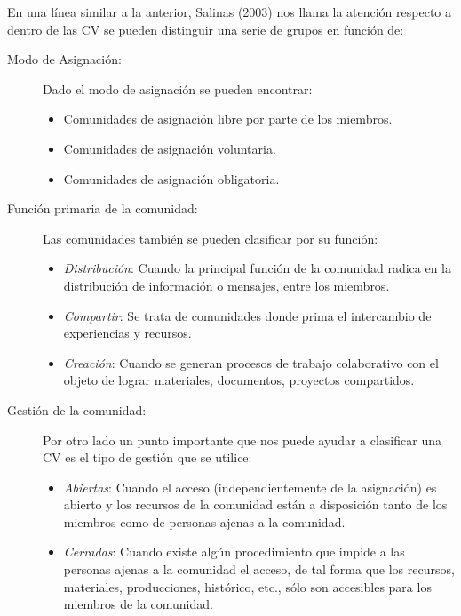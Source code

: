 En una línea similar a la anterior, Salinas (2003) nos llama la atención respecto a dentro de las CV se pueden distinguir una serie de grupos en función de:

\begin{description}
\item[Modo de Asignación: ] 
Dado el modo de asignación se pueden encontrar: 

\begin{itemize}
\item Comunidades de asignación libre por parte de los miembros.
\item Comunidades de asignación voluntaria.
\item Comunidades de asignación obligatoria.
\end{itemize}


\item[Función primaria de la comunidad: ] 
Las comunidades también se pueden clasificar por su función:  

\begin{itemize}
\item \emph{Distribución}: Cuando la principal función de la comunidad radica en la distribución de información o mensajes, entre los miembros.
\item \emph{Compartir}: Se trata de comunidades donde prima el intercambio de experiencias y recursos.
\item \emph{Creación}: Cuando se generan procesos de trabajo colaborativo con el objeto de lograr materiales, documentos, proyectos compartidos.
\end{itemize}


\item[Gestión de la comunidad: ] 
Por otro lado un punto importante que nos puede ayudar a clasificar una CV es el tipo de gestión que se utilice: 

\begin{itemize}
\item \emph{Abiertas}: Cuando el acceso (independientemente de la asignación) es abierto y los recursos de la comunidad están a disposición tanto de los miembros como de personas ajenas a la comunidad.
\item \emph{Cerradas}: Cuando existe algún procedimiento que impide a las personas ajenas a la comunidad el acceso, de tal forma que los recursos, materiales, producciones, histórico, etc., sólo son accesibles para los miembros de la comunidad.
\end{itemize}



\end{description}
